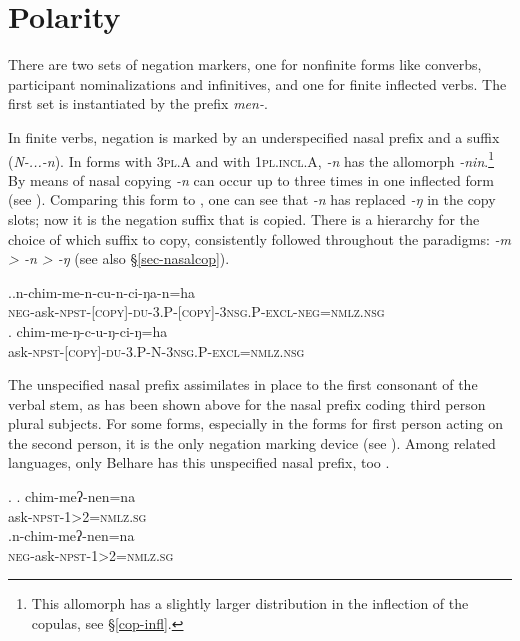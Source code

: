  


\section{Polarity}\label{neg}

There are two sets of negation markers, one for nonfinite forms like converbs, participant nominalizations and infinitives, and one for finite inflected verbs. The first set is instantiated by the prefix \emph{men-}. 

In finite verbs, negation is marked by an underspecified nasal prefix and a suffix (\emph{N-...-n}). In forms with {\scshape 3pl.A} and with {\scshape 1pl.incl.A}, \emph{-n} has the allomorph \emph{-nin}.\footnote{This allomorph has a slightly larger distribution in the inflection of the copulas, see  §\ref{cop-infl}.} By means of  nasal copying \emph{-n} can occur up to three times in one inflected form (see \Next[a]). Comparing this form to \Next[b], one can see that \emph{-n} has replaced \emph{-ŋ} in the copy slots; now it is the negation suffix that is copied. There is a hierarchy for the choice of which suffix to copy, consistently followed throughout the paradigms: \emph{-m > -n > -ŋ} (see also §\ref{sec-nasalcop}). 

\ex.\ag.n-chim-me-n-cu-n-ci-ŋa-n=ha\\
{\scshape neg-}ask{\scshape -npst-[copy]-du-3.P-[copy]-3nsg.P-excl-neg=nmlz.nsg}\\
	\bg. chim-me-ŋ-c-u-ŋ-ci-ŋ=ha\\
	ask{\scshape -npst-[copy]-du-3.P-N-3nsg.P-excl=nmlz.nsg}\\
	
	
The unspecified nasal prefix assimilates in place to the first consonant of the verbal stem, as has been shown above for the nasal prefix coding third person plural subjects. For some forms, especially in the forms for first person acting on the second person, it is the only negation marking device (see \Next). Among related languages, only Belhare has this unspecified nasal prefix, too \citep[554]{Bickel2003Belhare}. 

\ex. \ag.  chim-meʔ-nen=na\\
	 ask{\scshape -npst-1>2=nmlz.sg}\\
		\bg.n-chim-meʔ-nen=na\\
	{\scshape neg-}ask{\scshape -npst-1>2=nmlz.sg}\\

